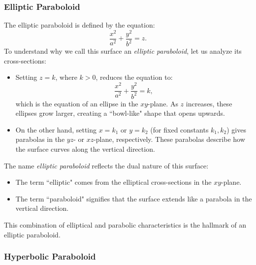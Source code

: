 \subsubsection*{Elliptic Paraboloid}

\noindent The elliptic paraboloid is defined by the equation:
\[
\frac{x^2}{a^2} + \frac{y^2}{b^2} = z.
\]
\noindent To understand why we call this surface an \textit{elliptic paraboloid}, let us analyze its cross-sections:
\begin{itemize}
    \item Setting \( z = k \), where \( k > 0 \), reduces the equation to:
    \[
    \frac{x^2}{a^2} + \frac{y^2}{b^2} = k,
    \]
    which is the equation of an ellipse in the \( xy \)-plane. As \( z \) increases, these ellipses grow larger, creating a ``bowl-like" shape that opens upwards.
    \item On the other hand, setting \( x = k_1 \) or \( y = k_2 \) (for fixed constants \( k_1, k_2 \)) gives parabolas in the \( yz \)- or \( xz \)-plane, respectively. These parabolas describe how the surface curves along the vertical direction.
\end{itemize}
\noindent The name \textit{elliptic paraboloid} reflects the dual nature of this surface:
\begin{itemize}
    \item The term ``elliptic" comes from the elliptical cross-sections in the \( xy \)-plane.
    \item The term ``paraboloid" signifies that the surface extends like a parabola in the vertical direction.
\end{itemize}
\noindent This combination of elliptical and parabolic characteristics is the hallmark of an elliptic paraboloid.

\subsubsection*{Hyperbolic Paraboloid}

